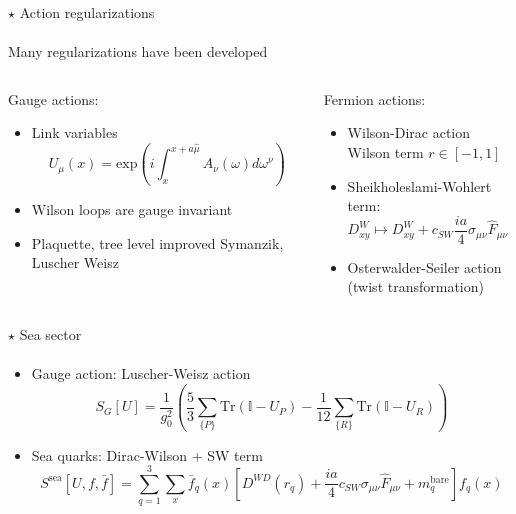 \documentclass{beamer}
\begin{document}
\begin{frame}[noframenumbering]{$\star$ Action regularizations}
      \framesubtitle{\hspace*{1pt}}
      Many regularizations have been developed
      \vspace{\baselineskip}
      \begin{columns}
            \begin{column}{0.45\textwidth}
                  Gauge actions:
                  \begin{itemize}
                        \item Link variables $$U_\mu (x) = \text{exp}\left(i\int_x^{x+a\hat\mu} A_\nu(\omega)d\omega^\nu \right)$$
                        \item Wilson loops are gauge invariant 
                        \item Plaquette, tree level improved Symanzik, Luscher Weisz
                  \end{itemize}
            \end{column}
            \begin{column}{0.45\textwidth}
                  Fermion actions:
                  \begin{itemize}
                        \item Wilson-Dirac action\\Wilson term $r \in [-1,1]$
                        \item Sheikholeslami-Wohlert term: $$ D^W_{xy} \longmapsto D^W_{xy} + c_{SW} \frac{ia}{4}\sigma_{\mu\nu}\hat F_{\mu\nu} (x) \delta_{xy} $$
                        \item Osterwalder-Seiler action\\(twist transformation)
                  \end{itemize}
            \end{column}
      \end{columns}
\end{frame}

\begin{frame}[noframenumbering]{$\star$ Sea sector}
      \framesubtitle{\hspace*{1pt}}
      \begin{itemize}%
            \item Gauge action: Luscher-Weisz action
            $$ S_G[U] = \frac{1}{g_0^2}\left(\frac{5}{3}\sum_{\{P\}} \text{Tr}\left(\mathbb{I} - U_P \right) - \frac{1}{12}\sum_{\{R\}}\text{Tr}\left( \mathbb{I}-U_R \right) \right)$$
            \item Sea quarks: Dirac-Wilson + SW term
            $$ S^\text{sea}[U,f,\bar f] = \sum_{q=1}^3 \sum_{x} \bar f_q (x) \left[ D^{WD}(r_q) + \frac{ia}{4}c_{SW}\sigma_{\mu\nu}\hat{F}_{\mu\nu} + m^\text{bare}_q \right] f_q (x) $$
      \end{itemize}
\end{frame}
\end{document}
